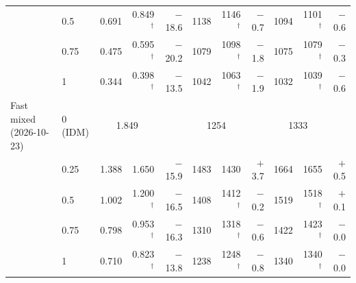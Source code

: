 \begin{table}[htbp]
\begin{tabular}{llrrrrrrrrr}
 & 0.5 & 0.691 & 0.849$^\dagger$ & $-$18.6 & 1138 & 1146$^\dagger$ & $-$0.7 & 1094 & 1101$^\dagger$ & $-$0.6 \\
 & 0.75 & 0.475 & 0.595$^\dagger$ & $-$20.2 & 1079 & 1098$^\dagger$ & $-$1.8 & 1075 & 1079$^\dagger$ & $-$0.3 \\
 & 1 & 0.344 & 0.398$^\dagger$ & $-$13.5 & 1042 & 1063$^\dagger$ & $-$1.9 & 1032 & 1039$^\dagger$ & $-$0.6 \\
\midrule
Fast mixed (2026-10-23) & 0 (IDM) & \multicolumn{2}{c}{1.849} & & \multicolumn{2}{c}{1254} & & \multicolumn{2}{c}{1333} & \\
 & 0.25 & 1.388 & 1.650 & $-$15.9 & 1483 & 1430 & $+$3.7 & 1664 & 1655 & $+$0.5 \\
 & 0.5 & 1.002 & 1.200$^\dagger$ & $-$16.5 & 1408 & 1412$^\dagger$ & $-$0.2 & 1519 & 1518$^\dagger$ & $+$0.1 \\
 & 0.75 & 0.798 & 0.953$^\dagger$ & $-$16.3 & 1310 & 1318$^\dagger$ & $-$0.6 & 1422 & 1423$^\dagger$ & $-$0.0 \\
 & 1 & 0.710 & 0.823$^\dagger$ & $-$13.8 & 1238 & 1248$^\dagger$ & $-$0.8 & 1340 & 1340$^\dagger$ & $-$0.0 \\
\bottomrule
\end{tabular}
\end{table}
